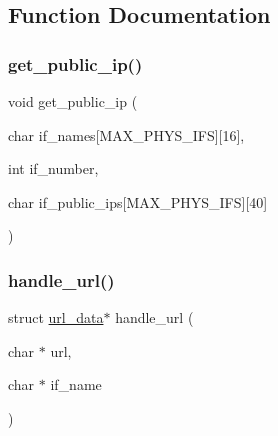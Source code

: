 \subsection{Function Documentation}
\mbox{\label{public-ip_8c_a343631cf6f2ceb1736d8b227c2cf76d3}} 
\subsubsection{\texorpdfstring{get\+\_\+public\+\_\+ip()}{get\_public\_ip()}}
{\footnotesize\ttfamily void get\+\_\+public\+\_\+ip (\begin{DoxyParamCaption}\item[{char}]{if\+\_\+names\mbox{[}\+M\+A\+X\+\_\+\+P\+H\+Y\+S\+\_\+\+I\+F\+S\mbox{]}\mbox{[}16\mbox{]},  }\item[{int}]{if\+\_\+number,  }\item[{char}]{if\+\_\+public\+\_\+ips\mbox{[}\+M\+A\+X\+\_\+\+P\+H\+Y\+S\+\_\+\+I\+F\+S\mbox{]}\mbox{[}40\mbox{]} }\end{DoxyParamCaption})}

\mbox{\label{public-ip_8c_a546e9ee82a2fff0c37e173d76ab08db4}} 
\subsubsection{\texorpdfstring{handle\+\_\+url()}{handle\_url()}}
{\footnotesize\ttfamily struct \hyperlink{structurl__data}{url\+\_\+data}$\ast$ handle\+\_\+url (\begin{DoxyParamCaption}\item[{char $\ast$}]{url,  }\item[{char $\ast$}]{if\+\_\+name }\end{DoxyParamCaption})}

